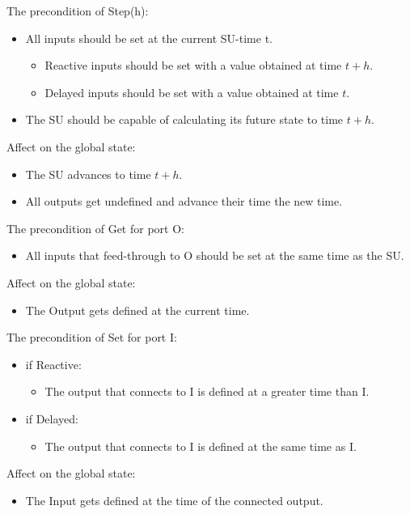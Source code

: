 \documentclass{beamer}
\begin{document}
\begin{frame}{The precondition of Step(h):}
    \begin{itemize}
        \item All inputs should be set at the current SU-time t.
        \begin{itemize}
            \item Reactive inputs should be set with a value obtained at time $t+h$.
             \item Delayed inputs should be set with a value obtained at time $t$.
        \end{itemize}
        \item The SU should be capable of calculating its future state to time $t+h$. 
    \end{itemize}

    Affect on the global state:
    \begin{itemize}
        \item The SU advances to time $t+h$.
        \item All outputs get undefined and advance their time the new time.
    \end{itemize}
\end{frame}


\begin{frame}{The precondition of Get for port O:}
    \begin{itemize}
        \item All inputs that feed-through to O should be set at the same time as the SU.
    \end{itemize}
    Affect on the global state:
    \begin{itemize}
        \item The Output gets defined at the current time.
    \end{itemize}
\end{frame}

\begin{frame}{The precondition of Set for port I:}
    \begin{itemize}
        \item if Reactive:
        \begin{itemize}
            \item The output that connects to I is defined at a greater time than I.
        \end{itemize}
        \item if Delayed:
        \begin{itemize}
            \item The output that connects to I is defined at the same time as I.
        \end{itemize}
    \end{itemize}
    Affect on the global state:
    \begin{itemize}
        \item The Input gets defined at the time of the connected output.
    \end{itemize}
\end{frame}
\end{document}
